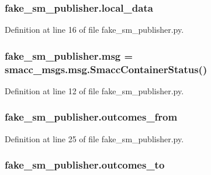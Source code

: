 \subsubsection[{\texorpdfstring{local\+\_\+data}{local_data}}]{\setlength{\rightskip}{0pt plus 5cm}fake\+\_\+sm\+\_\+publisher.\+local\+\_\+data}\hypertarget{namespacefake__sm__publisher_ae7bcc56d3653f72dbe5929768fe0d114}{}\label{namespacefake__sm__publisher_ae7bcc56d3653f72dbe5929768fe0d114}


Definition at line 16 of file fake\+\_\+sm\+\_\+publisher.\+py.

\subsubsection[{\texorpdfstring{msg}{msg}}]{\setlength{\rightskip}{0pt plus 5cm}fake\+\_\+sm\+\_\+publisher.\+msg = smacc\+\_\+msgs.\+msg.\+Smacc\+Container\+Status()}\hypertarget{namespacefake__sm__publisher_abdcc720c2a46d017eab5ff36ecbe453b}{}\label{namespacefake__sm__publisher_abdcc720c2a46d017eab5ff36ecbe453b}


Definition at line 12 of file fake\+\_\+sm\+\_\+publisher.\+py.

\subsubsection[{\texorpdfstring{outcomes\+\_\+from}{outcomes_from}}]{\setlength{\rightskip}{0pt plus 5cm}fake\+\_\+sm\+\_\+publisher.\+outcomes\+\_\+from}\hypertarget{namespacefake__sm__publisher_a355cab829d8e0a4361917acecce8fe22}{}\label{namespacefake__sm__publisher_a355cab829d8e0a4361917acecce8fe22}


Definition at line 25 of file fake\+\_\+sm\+\_\+publisher.\+py.

\subsubsection[{\texorpdfstring{outcomes\+\_\+to}{outcomes_to}}]{\setlength{\rightskip}{0pt plus 5cm}fake\+\_\+sm\+\_\+publisher.\+outcomes\+\_\+to}\hypertarget{namespacefake__sm__publisher_a6ae0e1e0afdba1d1e558ea87bf79df4c}{}\label{namespacefake__sm__publisher_a6ae0e1e0afdba1d1e558ea87bf79df4c}


